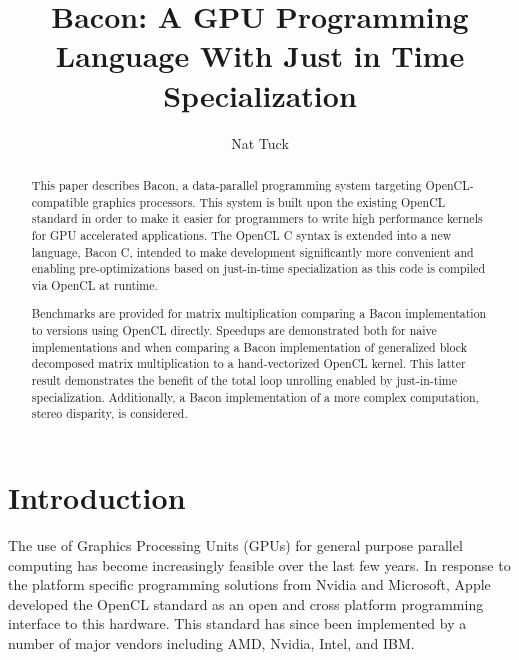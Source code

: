 \documentclass{llncs}
\begin{document}
\title{Bacon: A GPU Programming Language With Just in Time Specialization}

\author{Nat Tuck}


\maketitle


\begin{abstract}

This paper describes Bacon, a data-parallel programming system
targeting OpenCL-compatible graphics processors. This system is built
upon the existing OpenCL standard in order to make it easier for
programmers to write high performance kernels for GPU accelerated
applications. The OpenCL C syntax is extended into a new language,
Bacon C, intended to make development significantly more convenient
and enabling pre-optimizations based on just-in-time specialization as
this code is compiled via OpenCL at runtime.

Benchmarks are provided for matrix multiplication comparing a Bacon
implementation to versions using OpenCL directly. Speedups are
demonstrated both for naive implementations and when comparing a Bacon
implementation of generalized block decomposed matrix multiplication
to a hand-vectorized OpenCL kernel. This latter result demonstrates
the benefit of the total loop unrolling enabled by just-in-time
specialization. Additionally, a Bacon implementation of a more complex
computation, stereo disparity, is considered.

\end{abstract}

\section{Introduction}

The use of Graphics Processing Units (GPUs) for general purpose
parallel computing has become increasingly feasible over the last few
years. In response to the platform specific programming solutions from
Nvidia and Microsoft, Apple developed the OpenCL standard as an open
and cross platform programming interface to this hardware. This
standard has since been implemented by a number of major vendors
including AMD, Nvidia, Intel, and IBM.
\end{document}
